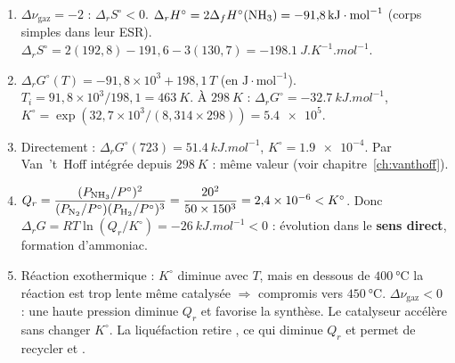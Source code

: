 \correction
\begin{enumerate}
  \item $\Delta\nu_{\text{gaz}} = -2$ : $\Delta_rS^\circ<0$. $\Delta_rH^\circ = 2\Delta_fH^\circ(\ce{NH3}) = \SI{-91,8}{kJ.mol^{-1}}$ (corps simples dans leur ESR). $\Delta_rS^\circ = 2(192{,}8) - 191{,}6 - 3(130{,}7) = \SI{-198,1}{J.K^{-1}.mol^{-1}}$.
  \item $\Delta_rG^\circ(T) = -91{,}8\times10^3 + 198{,}1\,T$ (en $\mathrm{J\cdot mol^{-1}}$). $T_i = 91{,}8\times10^3/198{,}1 = \SI{463}{K}$. À $\SI{298}{K}$ : $\Delta_rG^\circ = \SI{-32,7}{kJ.mol^{-1}}$, $K^\circ = \exp(32{,}7\times10^3/(8{,}314\times298)) = \num{5,4e5}$.
  \item Directement : $\Delta_rG^\circ(723) = \SI{51,4}{kJ.mol^{-1}}$, $K^\circ = \num{1,9e-4}$. Par Van~'t~Hoff intégrée depuis $\SI{298}{K}$ : même valeur (voir chapitre~\ref{ch:vanthoff}).
  \item $Q_r = \dfrac{(P_{\ce{NH3}}/P^\circ)^2}{(P_{\ce{N2}}/P^\circ)(P_{\ce{H2}}/P^\circ)^3} = \dfrac{20^2}{50\times150^3} = \num{2,4e-6} < K^\circ$. Donc $\Delta_rG = RT\ln(Q_r/K^\circ) = \SI{-26}{kJ.mol^{-1}} < 0$ : évolution dans le \textbf{sens direct}, formation d'ammoniac.
  \item Réaction exothermique : $K^\circ$ diminue avec $T$, mais en dessous de $\SI{400}{\celsius}$ la réaction est trop lente même catalysée $\Rightarrow$ compromis vers $\SI{450}{\celsius}$. $\Delta\nu_{\text{gaz}}<0$ : une haute pression diminue $Q_r$ et favorise la synthèse. Le catalyseur accélère sans changer $K^\circ$. La liquéfaction retire , ce qui diminue $Q_r$ et permet de recycler  et .
\end{enumerate}

